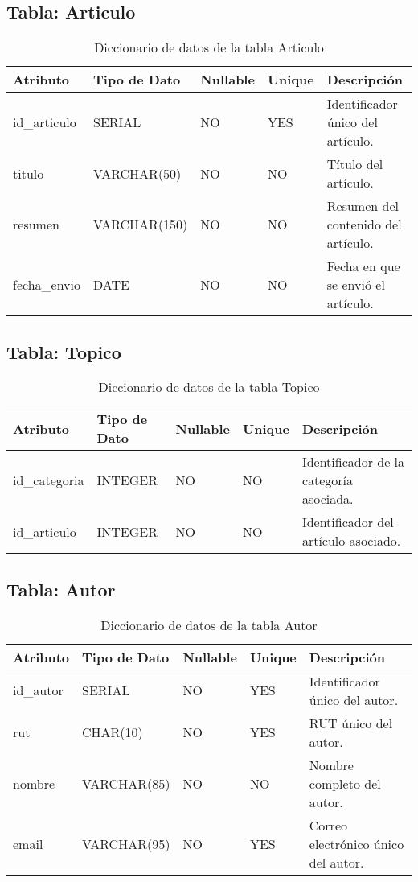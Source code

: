\documentclass{article}
\begin{document}
\subsection{Tabla: Articulo}
\begin{table}[H]
\centering
\begin{tabular}{|l|l|l|l|p{6cm}|}
\hline
\textbf{Atributo} & \textbf{Tipo de Dato} & \textbf{Nullable} & \textbf{Unique} & \textbf{Descripción} \\ \hline
id\_articulo & SERIAL & NO & YES & Identificador único del artículo. \\ \hline
titulo & VARCHAR(50) & NO & NO & Título del artículo. \\ \hline
resumen & VARCHAR(150) & NO & NO & Resumen del contenido del artículo. \\ \hline
fecha\_envio & DATE & NO & NO & Fecha en que se envió el artículo. \\ \hline
\end{tabular}
\caption{Diccionario de datos de la tabla Articulo}
\label{tab:articulo}
\end{table}

\subsection{Tabla: Topico}
\begin{table}[H]
\centering
\begin{tabular}{|l|l|l|l|p{6cm}|}
\hline
\textbf{Atributo} & \textbf{Tipo de Dato} & \textbf{Nullable} & \textbf{Unique} & \textbf{Descripción} \\ \hline
id\_categoria & INTEGER & NO & NO & Identificador de la categoría asociada. \\ \hline
id\_articulo & INTEGER & NO & NO & Identificador del artículo asociado. \\ \hline
\end{tabular}
\caption{Diccionario de datos de la tabla Topico}
\label{tab:topico}
\end{table}

\subsection{Tabla: Autor}
\begin{table}[H]
\centering
\begin{tabular}{|l|l|l|l|p{6cm}|}
\hline
\textbf{Atributo} & \textbf{Tipo de Dato} & \textbf{Nullable} & \textbf{Unique} & \textbf{Descripción} \\ \hline
id\_autor & SERIAL & NO & YES & Identificador único del autor. \\ \hline
rut & CHAR(10) & NO & YES & RUT único del autor. \\ \hline
nombre & VARCHAR(85) & NO & NO & Nombre completo del autor. \\ \hline
email & VARCHAR(95) & NO & YES & Correo electrónico único del autor. \\ \hline
\end{tabular}
\caption{Diccionario de datos de la tabla Autor}
\label{tab:autor}
\end{table}
\end{document}
